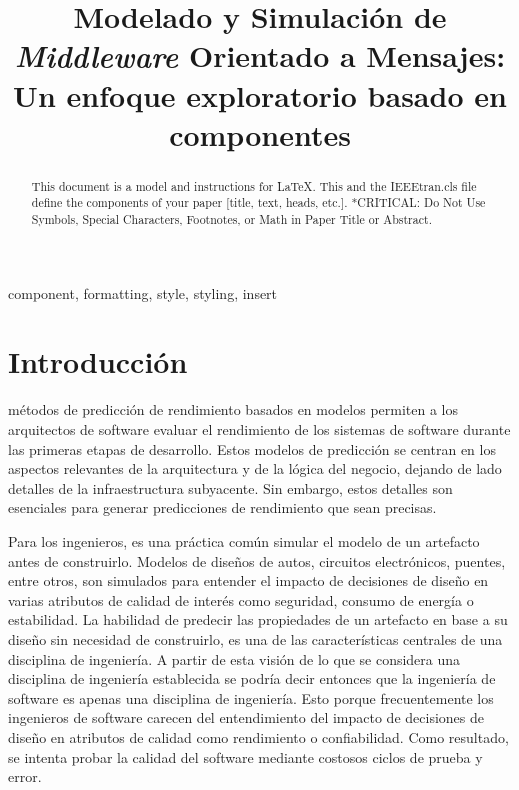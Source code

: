 \documentclass[article]{IEEEtran}
\begin{document}
\title{Modelado y Simulación de \emph{Middleware} Orientado a Mensajes: Un enfoque exploratorio basado en componentes \\
}

\author{
}

\maketitle

\begin{abstract}
This document is a model and instructions for \LaTeX.
This and the IEEEtran.cls file define the components of your paper [title, text, heads, etc.]. *CRITICAL: Do Not Use Symbols, Special Characters, Footnotes, 
or Math in Paper Title or Abstract.
\end{abstract}

\renewcommand\IEEEkeywordsname{Palabras Clave}
\begin{IEEEkeywords}
component, formatting, style, styling, insert
\end{IEEEkeywords}

\section{Introducción}
 métodos de predicción de rendimiento basados en modelos permiten a los arquitectos de software evaluar el rendimiento de los sistemas de software durante las primeras etapas de desarrollo. Estos modelos de predicción se centran en los aspectos relevantes de la arquitectura y de la lógica del negocio, dejando de lado detalles de la infraestructura subyacente. Sin embargo, estos detalles son esenciales para generar predicciones de rendimiento que sean precisas.

Para los ingenieros, es una práctica común simular el modelo de un artefacto antes de construirlo. Modelos de diseños de autos, circuitos electrónicos, puentes, entre otros, son simulados para entender el impacto de decisiones de diseño en varias atributos de calidad de interés como seguridad, consumo de energía o estabilidad. La habilidad de predecir las propiedades de un artefacto en base a su diseño sin necesidad de construirlo, es una de las características centrales de una disciplina de ingeniería. A partir de esta visión de lo que se considera una disciplina de ingeniería establecida se podría decir entonces que la ingeniería de software es apenas una disciplina de ingeniería\cite{palladio-blue-book}. Esto porque frecuentemente los ingenieros de software carecen del entendimiento del impacto de decisiones de diseño en atributos de calidad como rendimiento o confiabilidad. Como resultado, se intenta probar la calidad del software mediante costosos ciclos de prueba y error.
\end{document}
